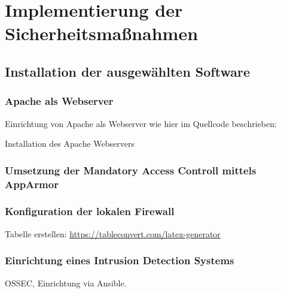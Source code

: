 \section{Implementierung der Sicherheitsmaßnahmen}

\subsection{Installation der ausgewählten Software}

\subsubsection{Apache als Webserver}

Einrichtung von Apache als Webserver wie hier im Quellcode beschrieben:

\begin{listing}[ht]{}
    \caption{Installation des Apache Webservers}
    \label{listing:installation_apache}
\end{listing}

\subsubsection{Umsetzung der Mandatory Access Controll mittels AppArmor}

\subsubsection{Konfiguration der lokalen Firewall}

Tabelle erstellen: \url{https://tableconvert.com/latex-generator}

\subsubsection{Einrichtung eines Intrusion Detection Systems}

OSSEC, Einrichtung via Ansible.